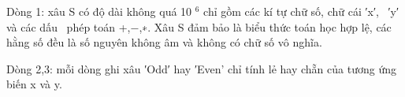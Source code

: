 Dòng 1: xâu S có độ dài không quá 10   $^    6   $   chỉ gồm các kí tự chữ số, chữ cái ′x′,  ′y′ và các dấu  phép toán +,−,∗. Xâu S đảm bảo là biểu thức toán học hợp lệ, các hằng số đều là số nguyên không âm và không có chữ số vô nghĩa.  

   Dòng 2,3: mỗi dòng ghi xâu ′Odd′ hay ′Even' chỉ tính lẻ hay chẵn của tương ứng biến x và y.  

\